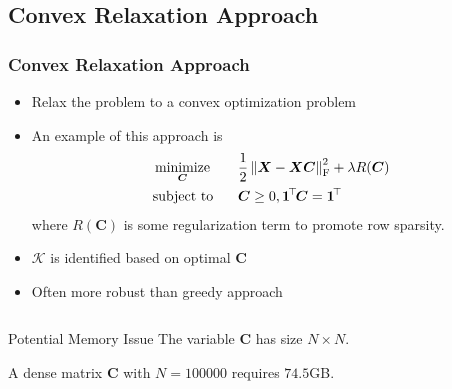 \documentclass[10pt,xcolor={usenames,dvipsnames,table}]{beamer}
\def\blue{\color{blue}}
\newcommand{\norm}[1]{\left\lVert#1\right\rVert}
\newcommand{\T}{\!\top\!}
\DeclareMathOperator*{\minimize}{minimize}
\newcommand{\citep}[1]{{\blue \scriptsize \parencite{#1}}}
\begin{document}
\subsection{Convex Relaxation Approach}%
\label{sub:convex_relaxation_approach}


\begin{frame}
    \frametitle{Convex Relaxation Approach}
    \begin{itemize}
        \item Relax the problem to a convex optimization problem \citep{gillis2018afast,gillis2014robust,gillis2013robustness,recht2012factoring,Elhamifar2012,Ammanouil2014blind}
        \item An example of this approach is \citep{esser2012convex,fu2015robust,gillis2018afast}
    \begin{alignat*}{2}
        & \minimize_{\bm{C}} \quad && \dfrac{1}{2} \norm{\bm{X} - \bm{X}\bm{C}}_{\rm F}^2 + \lambda R(\bm{C}) \\
        & \text{\rm subject to} && \bm{C} \geq 0, \bm{1}^{\T}\bm{C} = \bm{1}^{\T}
    \end{alignat*}
    where $R(\bm{C})$ is some regularization term to promote row sparsity.
\item $\mathcal{K}$ is identified based on optimal $\bm{C}$
\item Often more robust than greedy approach
    \end{itemize}

    \begin{columns}
        \begin{column}{0.6\textwidth}
        \begin{alertblock}{Potential Memory Issue}
            The variable $\bm{C}$ has size $N \times N$.
        \end{alertblock}
        A dense matrix $\bm{C}$ with $N=100000$ requires  $74.5$GB.


\end{column}
\end{columns}
\end{frame}
\end{document}
